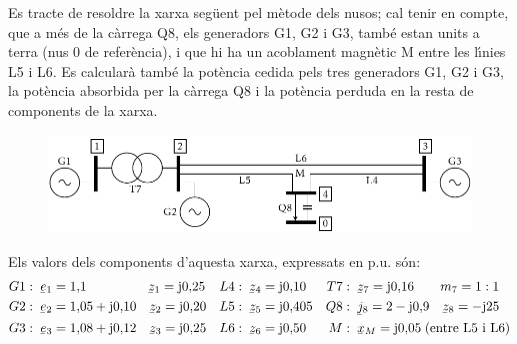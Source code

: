 \begin{exemple}
Es tracte de resoldre la xarxa seg\"{u}ent pel m\`{e}tode dels nusos; cal
tenir en compte, que a m\'{e}s de la c\`{a}rrega Q8, els generadors G1, G2 i
G3, tamb\'{e} estan units a terra (nus 0 de refer\`{e}ncia), i que hi ha un
acoblament magn\`{e}tic M entre les l\'{\i}nies L5 i L6. Es calcular\`{a} tamb\'{e}
la pot\`{e}ncia cedida pels tres generadors G1, G2 i G3, la pot\`{e}ncia
absorbida per la c\`{a}rrega Q8 i la pot\`{e}ncia perduda en la resta de
components de la xarxa.
\begin{figure}[htb]
\vspace{3mm} \centering
   \includegraphics{Imatges/Cap-ResXarxElec-Exemple-Circuit.pdf}
\end{figure}

Els valors dels components d'aquesta xarxa, expressats en p.u. s\'{o}n:
\begin{align*}
   G1 &:\; \cmplx{e}_1 = 1{,}1 \qquad\qquad\;\;\, \cmplx{z}_1 = \ju 0{,}25 & L4 &:\; \cmplx{z}_4 = \ju 0{,}10 & T7 &:\; \cmplx{z}_7 = \ju 0{,}16 \quad\quad m_7=1:1\\
   G2 &:\; \cmplx{e}_2 = 1{,}05+\ju0{,}10 \quad \cmplx{z}_2 = \ju 0{,}20 & L5 &:\; \cmplx{z}_5 = \ju 0{,}405  & Q8 &:\; \cmplx{j}_8 = 2-\ju0{,}9 \quad \cmplx{z}_8 = -\ju25 \\
   G3 &:\; \cmplx{e}_3 = 1{,}08+\ju0{,}12 \quad \cmplx{z}_3 = \ju 0{,}25 & L6 &:\; \cmplx{z}_6 = \ju 0{,}50 & M &:\; \cmplx{x}_M = \ju0{,}05\; \text{(entre L5 i L6)}
\end{align*}


\end{exemple}

